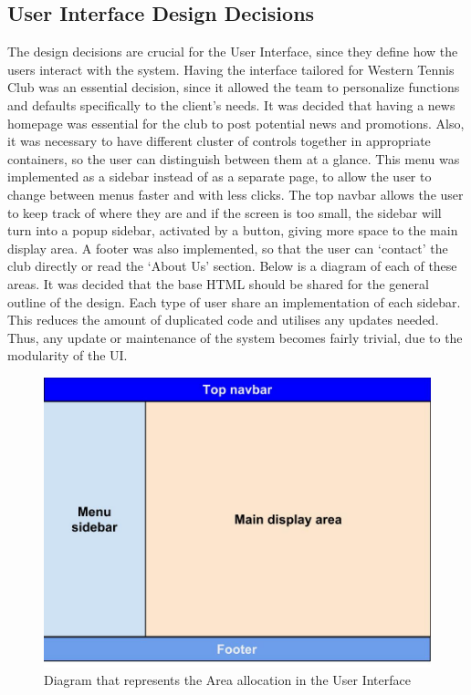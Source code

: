 \documentclass{l3proj}
\begin{document}
\subsection{User Interface Design Decisions}
The design decisions are crucial for the User Interface, since they define how the users interact with the system. Having the interface tailored for Western Tennis Club was an essential decision, since it allowed the team to personalize functions and defaults specifically to the client's needs. It was decided that having a news homepage was essential for the club to post potential news and promotions. Also, it was necessary to have different cluster of controls together in appropriate containers, so the user can distinguish between them at a glance. This menu was implemented as a sidebar instead of as a separate page, to allow the user to change between menus faster and with less clicks. The top navbar allows the user to keep track of where they are and if the screen is too small, the sidebar will turn into a popup sidebar, activated by a button, giving more space to the main display area. A footer was also implemented, so that the user can `contact' the club directly or read the `About Us' section. Below is a diagram of each of these areas. It was decided that the base HTML should be shared for the general outline of the design. Each type of user share an implementation of each sidebar. This reduces the amount of duplicated code and utilises any updates needed. Thus, any update or maintenance of the system becomes fairly trivial, due to the modularity of the UI.
\\
{
\begin{figure}[h]
\caption{Diagram that represents the Area allocation in the User Interface}
\centering
\includegraphics[scale=0.20]{AreaDiagramTP3.jpg}
\end{figure}
}
\end{document}
